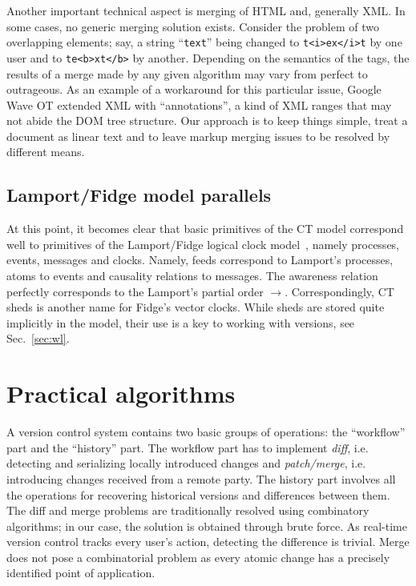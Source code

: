 \documentclass[twocolumn]{article}
\begin{document}
  Another important technical aspect is merging of HTML and, generally
  XML. In some cases, no generic merging solution exists. Consider the problem
   of two overlapping elements; say, a string ``\verb+text+'' being
  changed to \verb+t<i>ex</i>t+ by one user and to \verb+te<b>xt</b>+
  by another. Depending on the semantics of the tags,
  the results of a merge made by any given algorithm may vary from perfect
  to outrageous. As an example of a workaround for this particular
  issue, Google Wave OT extended XML with ``annotations'', a kind of XML
  ranges that may not abide the DOM tree  structure.
  Our approach is to keep things simple,
  treat a document as linear text and to leave markup
  merging issues to be resolved by different means.
  
   
\subsection {Lamport/Fidge model parallels}

At this point, it becomes clear that basic primitives of the CT model correspond well to primitives of the Lamport/Fidge logical clock model~\cite{lamport-clock,fidge-clock}, namely processes, events, messages and clocks. Namely, feeds correspond to Lamport's processes, atoms to events and causality relations to messages. The awareness relation perfectly corresponds to the Lamport's partial order $\to$. Correspondingly, CT sheds is another name for Fidge's vector clocks. While sheds are stored quite implicitly in the model, their use is a key to working with versions, see Sec.~\ref{sec:wl}.

\section {Practical algorithms}

A version control system contains two basic groups of operations: the ``workflow'' part and the ``history'' part. The workflow part has to implement \emph{diff}, i.e. detecting and serializing locally introduced changes and \emph{patch/merge}, i.e. introducing changes received from a remote party.
The history part involves all the operations for recovering historical versions and differences between them. The diff and merge problems are traditionally resolved using combinatory algorithms; in our case, the solution is obtained through brute force. As real-time version control tracks every user's action, detecting the difference is trivial. Merge does not pose a combinatorial problem as every atomic change has a precisely identified point of application.
\end{document}
